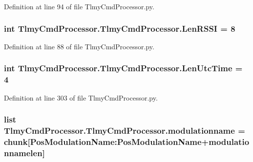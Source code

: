Definition at line 94 of file Tlmy\+Cmd\+Processor.\+py.

\hypertarget{namespace_tlmy_cmd_processor_1_1_tlmy_cmd_processor_a879b2c02ed1a38b0c9a0da5f30bdebd2}{}
\subsubsection[{Len\+R\+S\+S\+I}]{\setlength{\rightskip}{0pt plus 5cm}int Tlmy\+Cmd\+Processor.\+Tlmy\+Cmd\+Processor.\+Len\+R\+S\+S\+I = 8}\label{namespace_tlmy_cmd_processor_1_1_tlmy_cmd_processor_a879b2c02ed1a38b0c9a0da5f30bdebd2}


Definition at line 88 of file Tlmy\+Cmd\+Processor.\+py.

\hypertarget{namespace_tlmy_cmd_processor_1_1_tlmy_cmd_processor_abeeaa5fa0a6253d92758e2269eaebb18}{}
\subsubsection[{Len\+Utc\+Time}]{\setlength{\rightskip}{0pt plus 5cm}int Tlmy\+Cmd\+Processor.\+Tlmy\+Cmd\+Processor.\+Len\+Utc\+Time = 4}\label{namespace_tlmy_cmd_processor_1_1_tlmy_cmd_processor_abeeaa5fa0a6253d92758e2269eaebb18}


Definition at line 303 of file Tlmy\+Cmd\+Processor.\+py.

\hypertarget{namespace_tlmy_cmd_processor_1_1_tlmy_cmd_processor_a139941b75aab04bfd72966e3c3b88198}{}
\subsubsection[{modulationname}]{\setlength{\rightskip}{0pt plus 5cm}list Tlmy\+Cmd\+Processor.\+Tlmy\+Cmd\+Processor.\+modulationname = {\bf chunk}\mbox{[}Pos\+Modulation\+Name\+:\+Pos\+Modulation\+Name+{\bf modulationnamelen}\mbox{]}}\label{namespace_tlmy_cmd_processor_1_1_tlmy_cmd_processor_a139941b75aab04bfd72966e3c3b88198}


